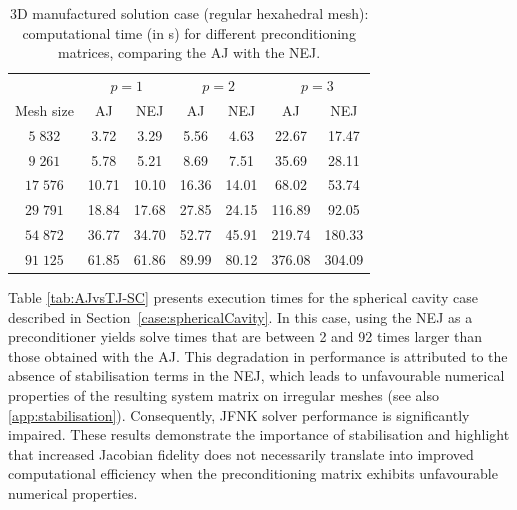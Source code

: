 \documentclass[review,3p]{elsarticle}
\begin{document}
\begin{table}[h]
	\centering
	\begin{tabular}{ccccccc}
		\multicolumn{1}{l}{} & \multicolumn{2}{c}{$p=1$} & \multicolumn{2}{c}{$p=2$} & \multicolumn{2}{c}{$p=3$} \\
		Mesh size             & AJ          & NEJ           & AJ          & NEJ           & AJ          & NEJ        \\ \hline
		$5\;832$                  & 3.72           & 3.29            &  5.56          & 4.63          & 22.67         &  17.47        \\
		$9\;261$                 & 5.78           & 5.21            &  8.69         & 7.51         & 35.69      &  28.11            \\
		$17\;576$                  & 10.71          & 10.10            &  16.36          & 14.01       & 68.02         &  53.74           \\
		$29\;791$                  & 18.84           & 17.68            &  27.85          & 24.15        & 116.89    &   92.05              \\
		$54\;872$                 & 36.77           & 34.70            &  52.77          & 45.91         & 219.74  &   180.33                 \\
		$91\;125$                 & 61.85          & 61.86          &  89.99        & 80.12       & 376.08 &  304.09              \\ \hline
	\end{tabular}
	\caption{3D manufactured solution case (regular hexahedral mesh): computational time (in s) for different preconditioning matrices, comparing the AJ with the NEJ.}
	\label{tab:AJvsTJ-MMS}
\end{table}

Table \ref{tab:AJvsTJ-SC} presents execution times for the spherical cavity case described in Section~\ref{case:sphericalCavity}.
In this case, using the NEJ as a preconditioner yields solve times that are between 2 and 92 times larger than those obtained with the AJ.
This degradation in performance is attributed to the absence of stabilisation terms in the NEJ, which leads to unfavourable numerical properties of the resulting system matrix on irregular meshes (see also \ref{app:stabilisation}). Consequently, JFNK solver performance is significantly impaired. These results demonstrate the importance of stabilisation and highlight that increased Jacobian fidelity does not necessarily translate into improved computational efficiency when the preconditioning matrix exhibits unfavourable numerical properties.
\end{document}
